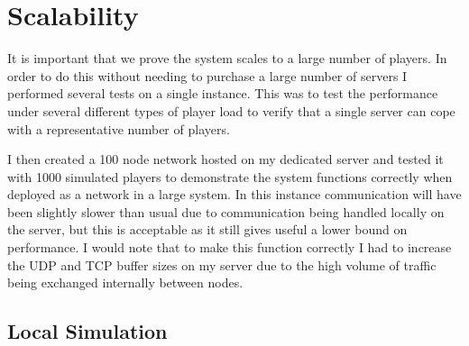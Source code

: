 \documentclass[10pt,twoside,notitlepage,a4paper]{report}
\begin{document}
	\section{Scalability}
	It is important that we prove the system scales to a large number of players. In order to do this without needing to purchase a large number of servers I performed several tests on a single instance. This was to test the performance under several different types of player load to verify that a single server can cope with a representative number of players.
	
	I then created a 100 node network hosted on my dedicated server and tested it with 1000 simulated players to demonstrate the system functions correctly when deployed as a network in a large system. In this instance communication will have been slightly slower than usual due to communication being handled locally on the server, but this is acceptable as it still gives useful a lower bound on performance. I would note that to make this function correctly I had to increase the UDP and TCP buffer sizes on my server due to the high volume of traffic being exchanged internally between nodes.
	\subsection{Local Simulation}
	\label{sec:localsim}
\end{document}
